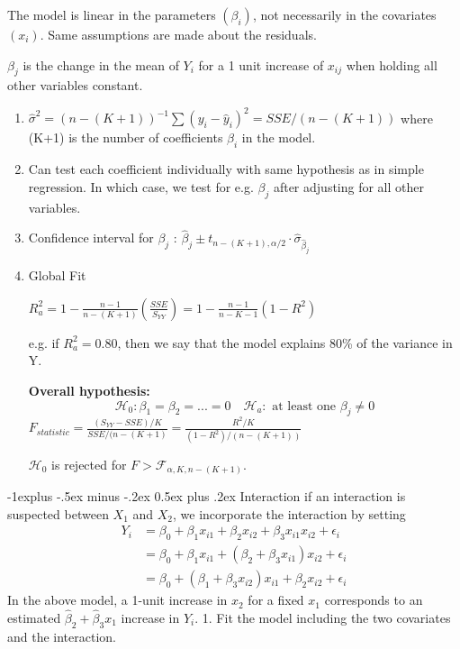 \documentclass[8pt,landscape]{article}
\makeatletter
\renewcommand{\subsection}{\@startsection{subsection}{2}{0mm}%
                                {-1explus -.5ex minus -.2ex}%
                                {0.5ex plus .2ex}%
                                {\normalfont\normalsize\bfseries}}
\makeatother
\begin{document}
\begin{multicols}{3}
The model is linear in the parameters $(\beta_i)$, not necessarily in the covariates $(x_i)$. Same assumptions are made about the residuals. 

$\beta_j$ is the change in the mean of $Y_i$ for a 1 unit increase of $x_{ij}$ when holding all other variables constant.

\begin{enumerate}
\item $\hat{\sigma}^2 = (n - (K+1)) ^{-1} \sum (y_i -\hat{y}_i)^2 = SSE/(n-(K+1))$ where (K+1) is the number of coefficients $\beta_i$ in the model. 
\item Can test each coefficient individually with same hypothesis as in simple regression. In which case, we test for e.g. $\beta_j$ after adjusting for all other variables.
\item Confidence interval for $\beta_j$ : $\hat{\beta}_j \pm t_{n-(K+1), \alpha/2} \cdot \hat{\sigma}_{\hat{\beta}_j}$
\item Global Fit

$R^2_a = 1 - \frac{n-1}{n-(K+1)}\left(\frac{SSE}{S_{YY}}\right) = 1 - \frac{n-1}{n-K-1}(1-R^2) $

e.g. if $R^2_a = 0.80$, then we say that the model explains 80\% of the variance in Y.

\textbf{Overall hypothesis:}
$$\mathcal{H}_0 : \beta_1 = \beta_2 = ... = 0 \quad \mathcal{H}_a : \text{ at least one } \beta_j \neq 0$$
$F_{statistic} = \frac{(S_{YY} - SSE ) /K }{SSE/(n-(K+1)} = \frac{R^2/ K}{(1-R^2)/(n-(K+1))}$

$\mathcal{H}_0$ is rejected for $F> \mathcal{F}_{\alpha, K, n-(K+1)}$.

\end{enumerate}
\subsection{Interaction}
if an interaction is suspected between $X_1$ and $X_2$, we incorporate the interaction by setting
\begin{align*}
Y_i &= \beta_0 + \beta_1x_{i1} + \beta_2x_{i2} + \beta_3 x_{i1} x_{i2} + \epsilon_i \\ 
	&= \beta_0 + \beta_1x_{i1} +(\beta_2 + \beta_3x_{i1})x_{i2} + \epsilon_i \\
	&= \beta_0 + (\beta_1 +\beta_3x_{i2})x_{i1} + \beta_2 x_{i2}+ \epsilon_i 
\end{align*}
In the above model, a 1-unit increase in $x_2$ for a fixed $x_1$ corresponds to an estimated $\hat{\beta}_2 + \hat{\beta}_3 x_1$ increase in $Y_i$.
1. Fit the model including the two covariates and the interaction.


\end{multicols}
\end{document}
